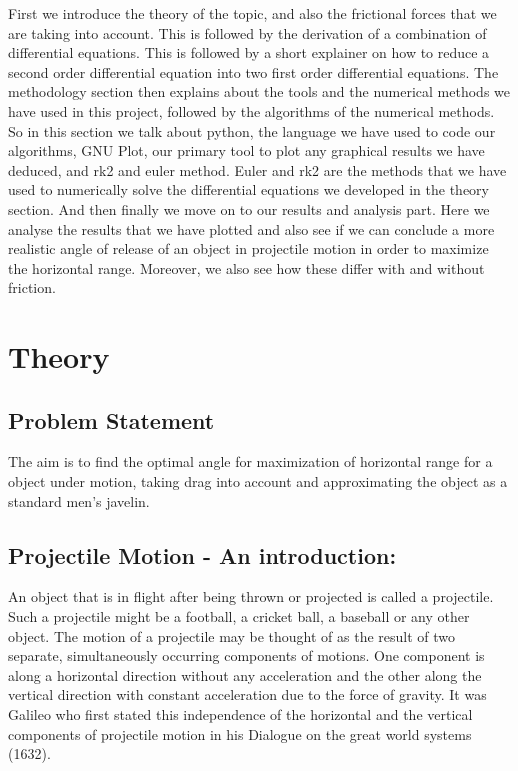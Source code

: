 \documentclass[12pt]{article}
\begin{document}
First we introduce the theory of the topic, and also the frictional forces that we are taking into account. This is followed by the derivation of a combination of differential equations. This is followed by a short explainer on how to reduce a second order differential equation into two first order differential equations. The methodology section then explains about the tools and the numerical methods we have used in this project, followed by the algorithms of the numerical methods. So in this section we talk about python, the language we have used to code our algorithms, GNU Plot, our primary tool to plot any graphical results we have deduced, and rk2 and euler method. Euler and rk2 are the methods that we have used to numerically solve the differential equations we developed in the theory section. And then finally we move on to our results and analysis part. Here we analyse the results that we have plotted and also see if we can conclude a more realistic angle of release of an object in projectile motion in order to maximize the horizontal range. Moreover, we also see how these differ with and without friction. 
\newpage
\section{Theory}
\label{sec:theory}
\subsection{Problem Statement}
The aim is to find the optimal angle for maximization of horizontal range for a object under motion, taking drag into account and approximating the object as a standard men's javelin. 
\subsection{Projectile Motion - An introduction:}
An object that is in flight after being thrown or projected is called a projectile. Such a projectile might be a football, a cricket ball, a baseball or any other object. The motion of a projectile may be thought of as the result of two separate, simultaneously occurring components of motions. One component is along a horizontal direction without any acceleration and the other along the vertical direction with constant acceleration due to the force of gravity. It was Galileo who first stated this independence of the horizontal and the vertical components of projectile motion in his Dialogue on the great world systems (1632).
\end{document}
